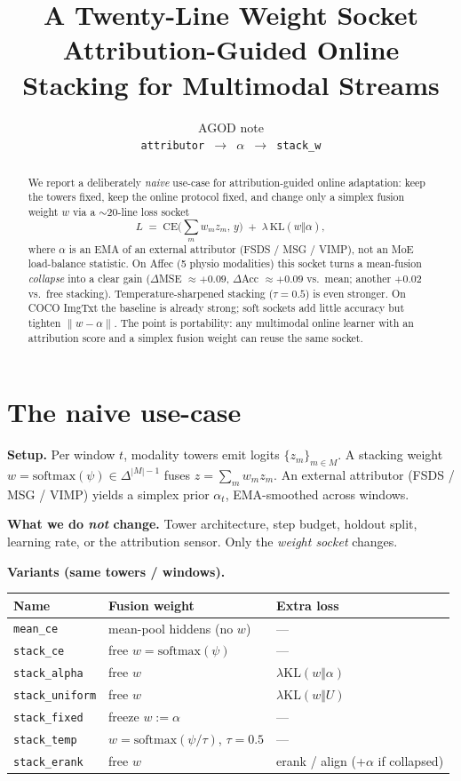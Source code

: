 \documentclass[11pt]{article}
\title{\textbf{A Twenty-Line Weight Socket}\\
\large Attribution-Guided Online Stacking for Multimodal Streams}
\author{AGOD note \\ \texttt{attributor $\to$ $\alpha$ $\to$ stack\_w}}
\date{}
\begin{document}
\maketitle

\begin{abstract}
\noindent
We report a deliberately \emph{naive} use-case for attribution-guided online
adaptation: keep the towers fixed, keep the online protocol fixed, and change
only a simplex fusion weight $w$ via a $\sim$20-line loss socket
\[
  L \;=\; \mathrm{CE}\!\big(\textstyle\sum_m w_m z_m,\, y\big)
        \;+\; \lambda\,\mathrm{KL}(w\Vert\alpha),
\]
where $\alpha$ is an EMA of an external attributor (FSDS / MSG / VIMP),
not an MoE load-balance statistic.
On Affec (5 physio modalities) this socket turns a mean-fusion
\emph{collapse} into a clear gain
($\Delta$MSE $\approx{+}0.09$, $\Delta$Acc $\approx{+}0.09$ vs.\ mean;
another ${+}0.02$ vs.\ free stacking).
Temperature-sharpened stacking ($\tau{=}0.5$) is even stronger.
On COCO ImgTxt the baseline is already strong; soft sockets add little
accuracy but tighten $\|w-\alpha\|$.
The point is portability: any multimodal online learner with an
attribution score and a simplex fusion weight can reuse the same socket.
\end{abstract}

\section{The naive use-case}
\label{sec:naive}

\textbf{Setup.}
Per window $t$, modality towers emit logits $\{z_m\}_{m\in M}$.
A stacking weight $w=\mathrm{softmax}(\psi)\in\Delta^{|M|-1}$ fuses
$\hat z=\sum_m w_m z_m$.
An external attributor (FSDS / MSG / VIMP) yields a simplex prior
$\alpha_t$, EMA-smoothed across windows.

\textbf{What we do \emph{not} change.}
Tower architecture, step budget, holdout split, learning rate, or the
attribution sensor. Only the \emph{weight socket} changes.

\textbf{Variants (same towers / windows).}
\begin{center}
\small
\begin{tabular}{@{}lll@{}}
\toprule
Name & Fusion weight & Extra loss \\
\midrule
\texttt{mean\_ce}      & mean-pool hiddens (no $w$) & --- \\
\texttt{stack\_ce}     & free $w=\mathrm{softmax}(\psi)$ & --- \\
\texttt{stack\_alpha}  & free $w$ & $\lambda\mathrm{KL}(w\Vert\alpha)$ \\
\texttt{stack\_uniform}& free $w$ & $\lambda\mathrm{KL}(w\Vert U)$ \\
\texttt{stack\_fixed}  & freeze $w:=\alpha$ & --- \\
\texttt{stack\_temp}   & $w=\mathrm{softmax}(\psi/\tau)$, $\tau{=}0.5$ & --- \\
\texttt{stack\_erank}  & free $w$ & erank / align (+$\alpha$ if collapsed) \\
\bottomrule
\end{tabular}
\end{center}
\end{document}
